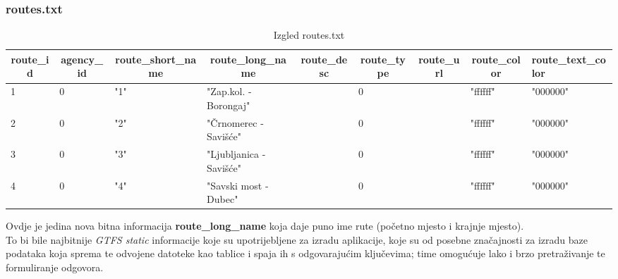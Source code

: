 \documentclass[zavrsnirad]{fer}
\begin{document}
\subsubsection{routes.txt}

\begin{table}[htb]
	\begin{adjustbox}{width=\columnwidth,center}
	\begin{tabular}{l|l|l|l|l|l|l|l|l}
		\hline
		\multicolumn{1}{c|}{\textbf{route\_id}} & \multicolumn{1}{c|}{\textbf{agency\_id}} & \multicolumn{1}{c|}{\textbf{route\_short\_name}} & \multicolumn{1}{c|}{\textbf{route\_long\_name}} & \multicolumn{1}{c|}{\textbf{route\_desc}} & \multicolumn{1}{c|}{\textbf{route\_type}} & \multicolumn{1}{c|}{\textbf{route\_url}} & \multicolumn{1}{c|}{\textbf{route\_color}} & \textbf{route\_text\_color} \\ \hline
		1 & 0 & "1" & "Zap.kol. - Borongaj" &  & 0 &  & "ffffff" & "000000" \\ \hline
		2 & 0 & "2" & "Črnomerec - Savišće" &  & 0 &  & "ffffff" & "000000" \\ \hline
		3 & 0 & "3" & "Ljubljanica -Savišće" &  & 0 &  & "ffffff" & "000000" \\ \hline
		4 & 0 & "4" & "Savski most - Dubec" &  & 0 &  & "ffffff" & "000000" \\ \hline
	\end{tabular}
	\end{adjustbox}
	\caption{Izgled routes.txt}
	\label{tbl:routes}
\end{table}

Ovdje je jedina nova bitna informacija \textbf{route\_long\_name} koja daje puno ime rute (početno mjesto i krajnje mjesto).\\

To bi bile najbitnije \textit{GTFS static} informacije koje su upotrijebljene za izradu aplikacije, koje su od posebne značajnosti za izradu baze podataka koja sprema te odvojene datoteke kao tablice i spaja ih s odgovarajućim ključevima; time omogućuje lako i brzo pretraživanje te formuliranje odgovora.

\newpage
\end{document}
